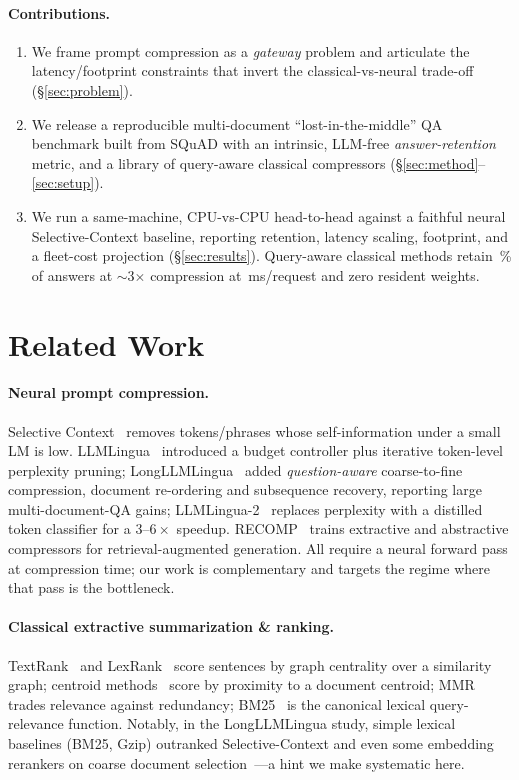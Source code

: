 \documentclass[11pt]{article}
\begin{document}
\paragraph{Contributions.}
\begin{enumerate}[leftmargin=1.4em,itemsep=1pt,topsep=2pt]
  \item We frame prompt compression as a \emph{gateway} problem and articulate the
  latency/footprint constraints that invert the classical-vs-neural trade-off
  (\S\ref{sec:problem}).
  \item We release a reproducible multi-document ``lost-in-the-middle'' QA benchmark
  built from SQuAD with an intrinsic, LLM-free \emph{answer-retention} metric, and a
  library of query-aware classical compressors (\S\ref{sec:method}--\ref{sec:setup}).
  \item We run a same-machine, CPU-vs-CPU head-to-head against a faithful neural
  Selective-Context baseline, reporting retention, latency scaling, footprint, and a
  fleet-cost projection (\S\ref{sec:results}). Query-aware classical methods retain
  \retBMQ\,\% of answers at $\sim$3$\times$ compression at \latBMQ\,ms/request and
  zero resident weights.
\end{enumerate}

\section{Related Work}
\paragraph{Neural prompt compression.}
Selective Context~\cite{selectivecontext} removes tokens/phrases whose
self-information under a small LM is low. LLMLingua~\cite{llmlingua} introduced a
budget controller plus iterative token-level perplexity pruning;
LongLLMLingua~\cite{longllmlingua} added \emph{question-aware} coarse-to-fine
compression, document re-ordering and subsequence recovery, reporting large
multi-document-QA gains; LLMLingua-2~\cite{llmlingua2} replaces perplexity with a
distilled token classifier for a $3$--$6\times$ speedup. RECOMP~\cite{recomp} trains
extractive and abstractive compressors for retrieval-augmented generation. All require
a neural forward pass at compression time; our work is complementary and targets the
regime where that pass is the bottleneck.

\paragraph{Classical extractive summarization \& ranking.}
TextRank~\cite{textrank} and LexRank~\cite{lexrank} score sentences by graph
centrality over a similarity graph; centroid methods~\cite{centroid} score by
proximity to a document centroid; MMR~\cite{mmr} trades relevance against redundancy;
BM25~\cite{bm25} is the canonical lexical query-relevance function. Notably, in the
LongLLMLingua study, simple lexical baselines (BM25, Gzip) outranked
Selective-Context and even some embedding rerankers on coarse document
selection~\cite{longllmlingua}---a hint we make systematic here.
\end{document}
